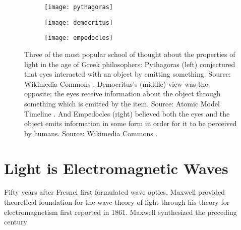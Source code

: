 \begin{figure}
\begin{subfigure}{.3\textwidth}
  \centering
  \texttt{[image: pythagoras]}
  \label{fig:pythagoras}
\end{subfigure}%
\begin{subfigure}{.3\textwidth}
  \centering
  \texttt{[image: democritus]}
  \label{fig:democritus}
\end{subfigure}
\begin{subfigure}{.3\textwidth}
  \centering
  \texttt{[image: empedocles]}
  \label{fig:empedocles}
\end{subfigure}%
\caption{Three of the most popular school of thought about the properties of light in the age of Greek philosophers: Pythagoras (left) conjectured that eyes interacted with an object by emitting something. Source: Wikimedia Commons \cite{pythagoras_pic}. Democritus's (middle) view was the opposite; the eyes receive information about the object through something which is emitted by the item. Source: Atomic Model Timeline \cite{democritus_pic}. And Empedocles (right) believed both the eyes and the object emits information in some form in order for it to be perceived by humans. Source: Wikimedia Commons \cite{empedocles_pic}.}
\label{fig:early_hypothesis}
\end{figure}

\section{Light is Electromagnetic Waves}
Fifty years after Fresnel first formulated wave optics, Maxwell provided theoretical foundation for the wave theory of light through his theory for electromagnetism first reported in 1861. Maxwell synthesized the preceding century

